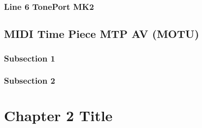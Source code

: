 \documentclass{tufte-book} %
\begin{document}
\subsection{Line 6 TonePort MK2}




\newpage

\section{MIDI Time Piece MTP AV (MOTU)}
\subsection{Subsection 1}

\lipsum[9-10]

\subsection{Subsection 2}

\lipsum[11-12]


\chapter{Chapter 2 Title}
\label{ch:2}

\lipsum[13-20]


\backmatter




\printindex %
\end{document}
